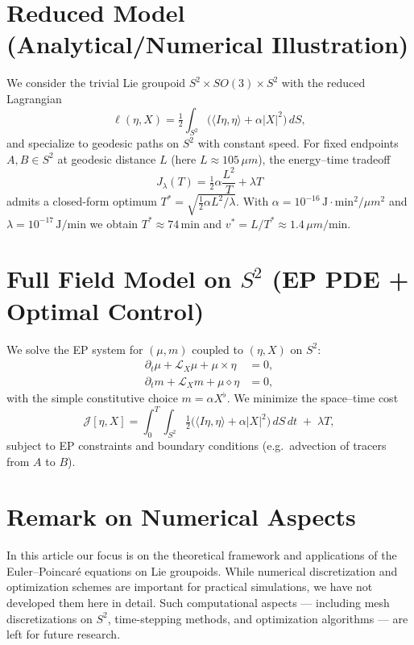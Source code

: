 \documentclass{article}
\begin{document}
\section*{Reduced Model (Analytical/Numerical Illustration)}
We consider the trivial Lie groupoid $S^2 \times SO(3) \times S^2$ with the reduced Lagrangian
\begin{equation}
\ell(\eta,X) = \tfrac12 \int_{S^2} \big(\langle I\eta,\eta\rangle + \alpha |X|^2\big)\, dS,
\end{equation}
and specialize to geodesic paths on $S^2$ with constant speed. For fixed endpoints $A,B\in S^2$ at geodesic distance $L$ (here $L \approx 105\,\mu m$), the energy--time tradeoff
\begin{equation}
J_\lambda(T) = \tfrac12 \alpha \frac{L^2}{T} + \lambda T
\end{equation}
admits a closed-form optimum $T^* = \sqrt{\tfrac{1}{2}\alpha L^2/\lambda}$. With
$\alpha = 10^{-16}\,\mathrm{J}\cdot \mathrm{min}^2/\mu m^2$ and $\lambda = 10^{-17}\,\mathrm{J}/\mathrm{min}$
we obtain $T^* \approx 74\,\mathrm{min}$ and $v^* = L/T^* \approx 1.4\,\mu m/\mathrm{min}$.

\section*{Full Field Model on $S^2$ (EP PDE + Optimal Control)}
We solve the EP system for $(\mu,m)$ coupled to $(\eta,X)$ on $S^2$:
\begin{align}
\partial_t \mu + \mathcal L_X \mu + \mu \times \eta &= 0,\\
\partial_t m + \mathcal L_X m + \mu \diamond \eta &= 0,
\end{align}
with the simple constitutive choice $m=\alpha X^\flat$. We minimize the space--time cost
\begin{equation}
\mathcal J[\eta,X] = \int_0^T\!\!\int_{S^2} \tfrac12 \big(\langle I\eta,\eta\rangle + \alpha|X|^2\big)\, dS\, dt
\; + \; \lambda T,
\end{equation}
subject to EP constraints and boundary conditions (e.g.\ advection of tracers from $A$ to $B$).

\section{Remark on Numerical Aspects}
In this article our focus is on the theoretical framework and applications of the Euler--Poincar\'e equations on Lie groupoids. While numerical discretization and optimization schemes are important for practical simulations, we have not developed them here in detail. Such computational aspects — including mesh discretizations on $S^2$, time-stepping methods, and optimization algorithms — are left for future research.
\end{document}
